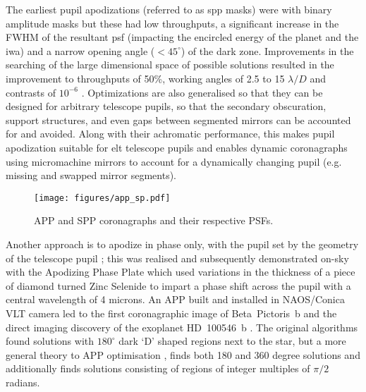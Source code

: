 \documentclass[letterpaper]{ar-1col}
\newcommand{\ld}{$\lambda/D$}
\begin{document}
The earliest pupil apodizations (referred to as \ac{spp} masks) were with binary amplitude masks \citep{Jacquinot64,Kasdin05} but these had low throughputs, a significant increase in the FWHM of the resultant \ac{psf} (impacting the encircled energy of the planet and the \ac{iwa}) and a narrow opening angle ($<45^\circ$) of the dark zone.
% 
Improvements in the searching of the large dimensional space of possible solutions resulted in the improvement to throughputs of 50\%, working angles of 2.5 to 15 \ld{} and contrasts of $10^{-6}$ \citep{Carlotti11}.
%
Optimizations are also generalised so that they can be designed for arbitrary telescope pupils, so that the secondary obscuration, support structures, and even gaps between segmented mirrors can be accounted for and avoided.
%
Along with their achromatic performance, this makes pupil apodization  suitable for \ac{elt} telescope pupils and enables dynamic coronagraphs using micromachine mirrors \citep{Leboulleux22b,Carlotti23} to account for a dynamically changing pupil (e.g. missing and swapped mirror segments).




\begin{figure}[ht]
  \centering
  \texttt{[image: figures/app\_sp.pdf]}
  \caption{APP and SPP coronagraphs and their respective PSFs.}
  \label{fig:app_sp}
\end{figure}


Another approach is to apodize in phase only, with the pupil set by the geometry of the telescope pupil \citep{Codona04}; this was realised and subsequently demonstrated on-sky with the Apodizing Phase Plate \citep[APP; ][]{Kenworthy07} which used variations in the thickness of a piece of diamond turned Zinc Selenide to impart a phase shift across the pupil with a central wavelength of 4 microns.
%
An APP built and installed in NAOS/Conica VLT camera \citep{Kenworthy10} led to the first coronagraphic image of Beta~Pictoris~b \citep{Quanz10} and the direct imaging discovery of the exoplanet HD~100546~b \citep{Quanz13}.
%
The original algorithms found solutions with $180^\circ$ dark `D' shaped regions next to the star, but a more general theory to APP optimisation \citep{Por17}, finds both 180 and 360 degree solutions and additionally finds solutions consisting of regions of integer multiples of $\pi/2$ radians.
\end{document}
